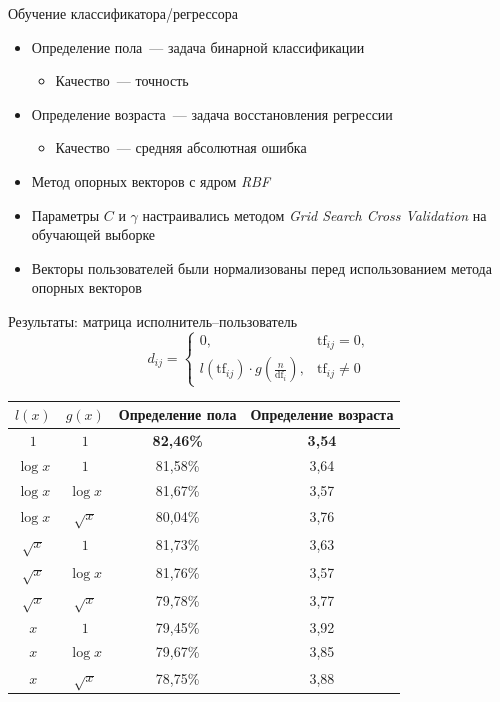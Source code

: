 \documentclass{beamer}
\begin{document}
\begin{frame}{Обучение классификатора/регрессора}
  \begin{itemize}
      \item {Определение пола~--- задача бинарной классификации}
          \begin{itemize}
              \item {Качество~--- точность}
          \end{itemize}
      \item {Определение возраста~--- задача восстановления регрессии}
          \begin{itemize}
              \item {Качество~--- средняя абсолютная ошибка}
          \end{itemize}
      \item {Метод опорных векторов с ядром \textit{RBF}}
      \item {Параметры $C$ и $\gamma$ настраивались методом \textit{Grid Search Cross Validation} на обучающей выборке}
      \item {Векторы пользователей были нормализованы перед использованием метода опорных векторов}
  \end{itemize}
\end{frame}

\begin{frame}{Результаты: матрица исполнитель--пользователь}
    \[d_{ij} = \begin{cases}
              0,& \mathrm{tf}_{ij} = 0,\\
              l(\mathrm{tf}_{ij}) \cdot g(\frac{n}{\mathrm{df}_{i}}),& \mathrm{tf}_{ij} \ne 0
        \end{cases}\]
    \begin{table}[h!]
    \centering
    \begin{tabular}{|c|c|c|c|}
    \hline
    \boldmath$l(x)$ & \boldmath$g(x)$ & \textbf{Определение пола} & \textbf{Определение возраста} \tabularnewline
    \hline
    $1$ & $1$ & \textbf{82,46\%} & \textbf{3,54} \tabularnewline
    \hline
    $\log{x}$ & $1$ & 81,58\% & 3,64 \tabularnewline
    \hline
    $\log{x}$ & $\log{x}$ & 81,67\% & 3,57 \tabularnewline
    \hline
    $\log{x}$ & $\sqrt{x}$ & 80,04\% & 3,76 \tabularnewline
    \hline
    $\sqrt{x}$ & $1$ & 81,73\% & 3,63 \tabularnewline
    \hline
    $\sqrt{x}$ & $\log{x}$ & 81,76\% & 3,57 \tabularnewline
    \hline
    $\sqrt{x}$ & $\sqrt{x}$ & 79,78\% & 3,77 \tabularnewline
    \hline
    $x$ & $1$ & 79,45\% & 3,92 \tabularnewline
    \hline
    $x$ & $\log{x}$ & 79,67\% & 3,85 \tabularnewline
    \hline
    $x$ & $\sqrt{x}$ & 78,75\% & 3,88 \tabularnewline
    \hline
    \end{tabular}
    \label{tab:tfidf_results}
    \end{table}
\end{frame}
\end{document}

